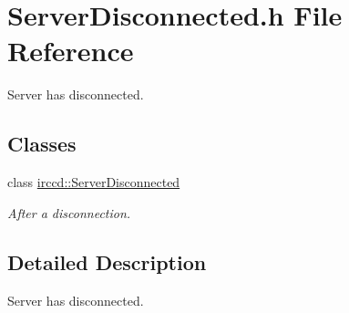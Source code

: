 \hypertarget{a00131}{\section{Server\-Disconnected.\-h File Reference}
\label{a00131}
}


Server has disconnected.  


\subsection*{Classes}
\begin{DoxyCompactItemize}
\item 
class \hyperlink{a00058}{irccd\-::\-Server\-Disconnected}
\begin{DoxyCompactList}\small\item\em After a disconnection. \end{DoxyCompactList}\end{DoxyCompactItemize}


\subsection{Detailed Description}
Server has disconnected. 
